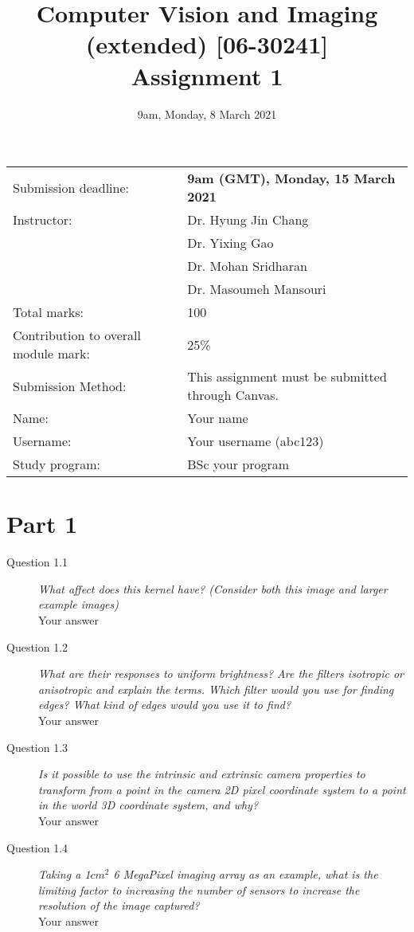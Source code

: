 \documentclass[a4paper, oneside]{article}
\newcommand{\assignment}[0]{assignment\xspace}
\newcommand{\Assignment}[0]{Assignment\xspace}
\begin{document}
	\title{Computer Vision and Imaging (extended) [06-30241]\\ \Assignment 1}
	\date{9am, Monday, 8 March 2021}
	
	\maketitle
	\begin{tabularx}{\textwidth}{lX}
		Submission deadline: & \textbf{9am (GMT), Monday, 15 March 2021}\\
		Instructor: & Dr. Hyung Jin Chang\\
		            & Dr. Yixing Gao\\
		            & Dr. Mohan Sridharan\\
		            & Dr. Masoumeh Mansouri\\
		Total marks: & 100\\
		Contribution to overall module mark: & 25\%\\
		Submission Method: & This \assignment must be submitted through Canvas.\\

		\addlinespace[1cm]
		Name: & Your name\\
		Username: & Your username (abc123)\\		
		Study program: &  BSc your program\\
	\end{tabularx}
	\section*{Part 1}
	\begin{description}		
		\item[Question 1.1 ] \emph{What affect does this kernel have? (Consider both this image and larger example images)}
		\\ Your answer
		\item[Question 1.2 ] \emph{What are their responses to uniform brightness? Are the filters isotropic or anisotropic and explain the terms. Which filter would you use for finding edges? What kind of edges would you use it to find?}
		\\ Your answer
		\item[Question 1.3]
		\emph{Is it possible to use the intrinsic and extrinsic camera properties to transform from a point in the camera 2D pixel coordinate system to a point in the world 3D coordinate system, and why?}
		\\ Your answer
				\item[Question 1.4]
		\emph{Taking a 1$cm^2$ 6 MegaPixel imaging array as an example, what is the limiting factor to increasing the number of sensors to increase the resolution of the image captured?}
		\\ Your answer

	\end{description}
	
\end{document}

